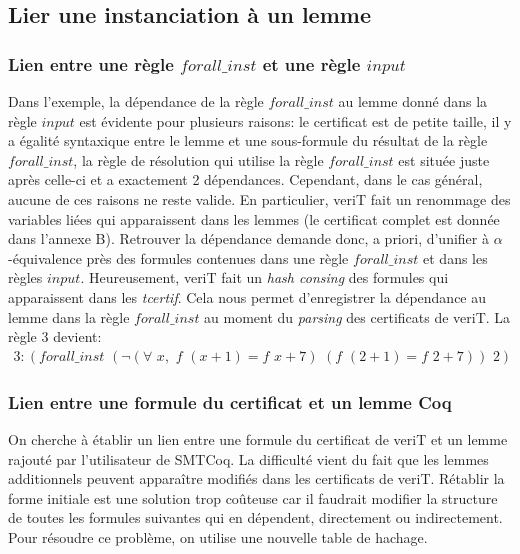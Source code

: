 \documentclass[11pt]{article}
\begin{document}
\subsection{Lier une instanciation à un lemme} \label{lien}

\subsubsection{Lien entre une règle $forall\_inst$ et une règle $input$} \label{lien_parsing}

Dans l'exemple, la dépendance de la règle $forall\_inst$ au lemme donné dans la règle $input$ est évidente pour plusieurs raisons: le certificat est de petite taille, il y a égalité syntaxique entre le lemme et une sous-formule du résultat de la règle $forall\_inst$, la règle de résolution qui utilise la règle $forall\_inst$ est située juste après celle-ci et a exactement 2 dépendances. Cependant, dans le cas général, aucune de ces raisons ne reste valide. En particulier, veriT fait un renommage des variables liées qui apparaissent dans les lemmes (le certificat complet est donnée dans l'annexe B). Retrouver la dépendance demande donc, a priori, d'unifier à $\alpha$-équivalence près des formules contenues dans une règle $forall\_inst$ et dans les règles $input$. Heureusement, veriT fait un \textit{hash consing} des formules qui apparaissent dans les \textit{tcertif}. Cela nous permet d'enregistrer la dépendance au lemme dans la règle $forall\_inst$ au moment du \textit{parsing} des certificats de veriT. La règle $3$ devient: 
\begin{align*}
3:(forall\_inst \,\, (\neg(\forall \,\,x, \,\,f \,\,(x+1) = f\,\,x+7) \,\,(f\,\, (2+1) = f\,\,2+7)) \,\,2) 
\end{align*}

\subsubsection{Lien entre une formule du certificat et un lemme Coq} \label{lien_formule_lemme}

On cherche à établir un lien entre une formule du certificat de veriT et un lemme rajouté par l'utilisateur de SMTCoq. La difficulté vient du fait que les lemmes additionnels peuvent apparaître modifiés dans les certificats de veriT. Rétablir la forme initiale est une solution trop coûteuse car il faudrait modifier la structure de toutes les formules suivantes qui en dépendent, directement ou indirectement. Pour résoudre ce problème, on utilise une nouvelle table de hachage. \medbreak
\end{document}
